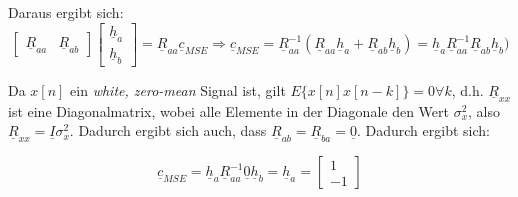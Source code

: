 Daraus ergibt sich:
\begin{equation}
 \begin{bmatrix} \underline{R}_{aa} & \underline{R}_{ab} \end{bmatrix} \begin{bmatrix} \underline{h}_a \\ \underline{h}_b \end{bmatrix} = \underline{R}_{aa} \underline{c}_{MSE} \Rightarrow \underline{c}_{MSE} = \underline{R}_{aa}^{-1} (\underline{R}_{aa} \underline{h}_a + \underline{R}_{ab} \underline{h}_b ) = \underline{h}_a \underline{R}_{aa}^{-1} \underline{R}_{ab} \underline{h}_b )
\end{equation}

Da $x[n]$ ein \emph{white, zero-mean} Signal ist, gilt $ E\{x[n] x[n-k]\} = 0 \forall k $, d.h. $\underline{R}_{xx}$ ist eine Diagonalmatrix, wobei alle Elemente in der Diagonale den Wert $\sigma_x^2$, also $\underline{R}_{xx} = \underline{I} \sigma_x^2$. Dadurch ergibt sich auch, dass $\underline{R}_{ab} = \underline{R}_{ba} = \underline{0}$. Dadurch ergibt sich:

\begin{equation}
 \underline{c}_{MSE} = \underline{h}_a \underline{R}_{aa}^{-1} \underline{0} \underline{h}_b = \underline{h}_a = \begin{bmatrix} 1 \\ -1 \end{bmatrix}
\end{equation}

